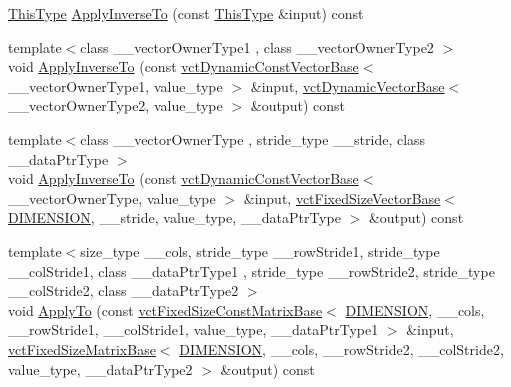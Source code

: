 \begin{DoxyCompactItemize}
\item 
\hyperlink{classvct_matrix_rotation3_const_base_ad26bf016ce37ea0532e1ce0aa7bba8a0}{This\+Type} \hyperlink{classvct_matrix_rotation3_const_base_a800f192ecd7bc5c5b6d2930b2546ab84}{Apply\+Inverse\+To} (const \hyperlink{classvct_matrix_rotation3_const_base_ad26bf016ce37ea0532e1ce0aa7bba8a0}{This\+Type} \&input) const 
\item 
{\footnotesize template$<$class \+\_\+\+\_\+vector\+Owner\+Type1 , class \+\_\+\+\_\+vector\+Owner\+Type2 $>$ }\\void \hyperlink{classvct_matrix_rotation3_const_base_a397a9e47a592fdd1249fa2f577f8fc17}{Apply\+Inverse\+To} (const \hyperlink{classvct_dynamic_const_vector_base}{vct\+Dynamic\+Const\+Vector\+Base}$<$ \+\_\+\+\_\+vector\+Owner\+Type1, value\+\_\+type $>$ \&input, \hyperlink{classvct_dynamic_vector_base}{vct\+Dynamic\+Vector\+Base}$<$ \+\_\+\+\_\+vector\+Owner\+Type2, value\+\_\+type $>$ \&output) const 
\item 
{\footnotesize template$<$class \+\_\+\+\_\+vector\+Owner\+Type , stride\+\_\+type \+\_\+\+\_\+stride, class \+\_\+\+\_\+data\+Ptr\+Type $>$ }\\void \hyperlink{classvct_matrix_rotation3_const_base_af1252a1e416a9b633d1eea893a5b92a9}{Apply\+Inverse\+To} (const \hyperlink{classvct_dynamic_const_vector_base}{vct\+Dynamic\+Const\+Vector\+Base}$<$ \+\_\+\+\_\+vector\+Owner\+Type, value\+\_\+type $>$ \&input, \hyperlink{classvct_fixed_size_vector_base}{vct\+Fixed\+Size\+Vector\+Base}$<$ \hyperlink{classvct_matrix_rotation3_const_base_a6bc9712dde55ee3fca0d7880feb6a903afdf02f4ad230d81f0ca2539c7feb61f3}{D\+I\+M\+E\+N\+S\+I\+O\+N}, \+\_\+\+\_\+stride, value\+\_\+type, \+\_\+\+\_\+data\+Ptr\+Type $>$ \&output) const 
\item 
{\footnotesize template$<$size\+\_\+type \+\_\+\+\_\+cols, stride\+\_\+type \+\_\+\+\_\+row\+Stride1, stride\+\_\+type \+\_\+\+\_\+col\+Stride1, class \+\_\+\+\_\+data\+Ptr\+Type1 , stride\+\_\+type \+\_\+\+\_\+row\+Stride2, stride\+\_\+type \+\_\+\+\_\+col\+Stride2, class \+\_\+\+\_\+data\+Ptr\+Type2 $>$ }\\void \hyperlink{classvct_matrix_rotation3_const_base_ab3872110e5cc432dbf0592d4af58854d}{Apply\+To} (const \hyperlink{classvct_fixed_size_const_matrix_base}{vct\+Fixed\+Size\+Const\+Matrix\+Base}$<$ \hyperlink{classvct_matrix_rotation3_const_base_a6bc9712dde55ee3fca0d7880feb6a903afdf02f4ad230d81f0ca2539c7feb61f3}{D\+I\+M\+E\+N\+S\+I\+O\+N}, \+\_\+\+\_\+cols, \+\_\+\+\_\+row\+Stride1, \+\_\+\+\_\+col\+Stride1, value\+\_\+type, \+\_\+\+\_\+data\+Ptr\+Type1 $>$ \&input, \hyperlink{classvct_fixed_size_matrix_base}{vct\+Fixed\+Size\+Matrix\+Base}$<$ \hyperlink{classvct_matrix_rotation3_const_base_a6bc9712dde55ee3fca0d7880feb6a903afdf02f4ad230d81f0ca2539c7feb61f3}{D\+I\+M\+E\+N\+S\+I\+O\+N}, \+\_\+\+\_\+cols, \+\_\+\+\_\+row\+Stride2, \+\_\+\+\_\+col\+Stride2, value\+\_\+type, \+\_\+\+\_\+data\+Ptr\+Type2 $>$ \&output) const 

\end{DoxyCompactItemize}
